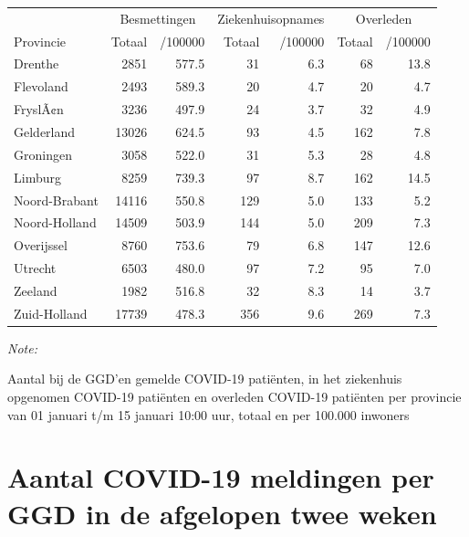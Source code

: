 \documentclass[
  english,
  man,floatsintext]{apa6}
\begin{document}
\begin{table}[H]
\centering
\begin{threeparttable}
\begin{tabular}{lrrrrrr}
\toprule
\multicolumn{1}{c}{ } & \multicolumn{2}{c}{Besmettingen} & \multicolumn{2}{c}{Ziekenhuisopnames} & \multicolumn{2}{c}{Overleden} \\
\cmidrule(l{3pt}r{3pt}){2-3} \cmidrule(l{3pt}r{3pt}){4-5} \cmidrule(l{3pt}r{3pt}){6-7}
Provincie & Totaal & /100000 & Totaal & /100000 & Totaal & /100000\\
\midrule
Drenthe & 2851 & 577.5 & 31 & 6.3 & 68 & 13.8\\
Flevoland & 2493 & 589.3 & 20 & 4.7 & 20 & 4.7\\
FryslÃ¢n & 3236 & 497.9 & 24 & 3.7 & 32 & 4.9\\
Gelderland & 13026 & 624.5 & 93 & 4.5 & 162 & 7.8\\
Groningen & 3058 & 522.0 & 31 & 5.3 & 28 & 4.8\\
Limburg & 8259 & 739.3 & 97 & 8.7 & 162 & 14.5\\
Noord-Brabant & 14116 & 550.8 & 129 & 5.0 & 133 & 5.2\\
Noord-Holland & 14509 & 503.9 & 144 & 5.0 & 209 & 7.3\\
Overijssel & 8760 & 753.6 & 79 & 6.8 & 147 & 12.6\\
Utrecht & 6503 & 480.0 & 97 & 7.2 & 95 & 7.0\\
Zeeland & 1982 & 516.8 & 32 & 8.3 & 14 & 3.7\\
Zuid-Holland & 17739 & 478.3 & 356 & 9.6 & 269 & 7.3\\
\bottomrule
\end{tabular}
\begin{tablenotes}
\item \textit{Note: } 
\item Aantal bij de GGD’en gemelde COVID-19 patiënten, in het ziekenhuis opgenomen COVID-19 patiënten en overleden COVID-19 patiënten per provincie van 01 januari t/m 15 januari 10:00 uur, totaal en per 100.000 inwoners
\end{tablenotes}
\end{threeparttable}
\end{table}

\newpage

\hypertarget{aantal-covid-19-meldingen-per-ggd-in-de-afgelopen-twee-weken}{%
\section{Aantal COVID-19 meldingen per GGD in de afgelopen twee weken}\label{aantal-covid-19-meldingen-per-ggd-in-de-afgelopen-twee-weken}}
\end{document}

